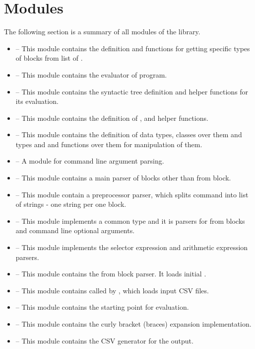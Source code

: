 \section{Modules}
The following section is a summary of all modules of the library.
\begin{itemize}
    \item {} -- This module contains the  definition and functions for getting specific types of blocks from list of .
    \item {} -- This module contains the evaluator of  program.
    \item {} -- This module contains the syntactic tree definition and helper functions for its evaluation.
    \item {} -- This module contains the definition of ,  and helper functions.
    \item {} -- This module contains the definition of  
        data types, classes over them and types  and  and functions over them for manipulation of them.
    \item {} -- A module for command line argument parsing.
    \item {} -- This module contains a main parser of blocks other than from block.
    \item {} -- This module contain a preprocessor parser, which splits command into list of strings - one string per one block.
    \item {} -- This module implements a common  type and it is parsers for from blocks and command line optional arguments.
    \item {} -- This module implements the selector expression and arithmetic expression parsers.
    \item {} -- This module contains the from block parser. It loads initial .
    \item {} -- This module contains  called by , which loads input CSV files.
    \item {} -- This module contains the starting point for  evaluation.
    \item {} -- This module contains the curly bracket (braces) expansion implementation.
    \item {} -- This module contains the CSV generator for the output.
\end{itemize}

